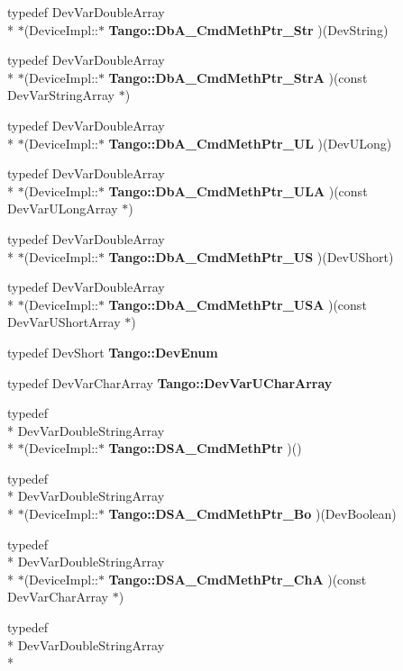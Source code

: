 \begin{DoxyCompactItemize}
typedef Dev\-Var\-Double\-Array \\*
$\ast$(Device\-Impl\-::$\ast$ {\bf Tango\-::\-Db\-A\-\_\-\-Cmd\-Meth\-Ptr\-\_\-\-Str} )(Dev\-String)
\item 
typedef Dev\-Var\-Double\-Array \\*
$\ast$(Device\-Impl\-::$\ast$ {\bf Tango\-::\-Db\-A\-\_\-\-Cmd\-Meth\-Ptr\-\_\-\-Str\-A} )(const Dev\-Var\-String\-Array $\ast$)
\item 
typedef Dev\-Var\-Double\-Array \\*
$\ast$(Device\-Impl\-::$\ast$ {\bf Tango\-::\-Db\-A\-\_\-\-Cmd\-Meth\-Ptr\-\_\-\-U\-L} )(Dev\-U\-Long)
\item 
typedef Dev\-Var\-Double\-Array \\*
$\ast$(Device\-Impl\-::$\ast$ {\bf Tango\-::\-Db\-A\-\_\-\-Cmd\-Meth\-Ptr\-\_\-\-U\-L\-A} )(const Dev\-Var\-U\-Long\-Array $\ast$)
\item 
typedef Dev\-Var\-Double\-Array \\*
$\ast$(Device\-Impl\-::$\ast$ {\bf Tango\-::\-Db\-A\-\_\-\-Cmd\-Meth\-Ptr\-\_\-\-U\-S} )(Dev\-U\-Short)
\item 
typedef Dev\-Var\-Double\-Array \\*
$\ast$(Device\-Impl\-::$\ast$ {\bf Tango\-::\-Db\-A\-\_\-\-Cmd\-Meth\-Ptr\-\_\-\-U\-S\-A} )(const Dev\-Var\-U\-Short\-Array $\ast$)
\item 
typedef Dev\-Short {\bf Tango\-::\-Dev\-Enum}
\item 
typedef Dev\-Var\-Char\-Array {\bf Tango\-::\-Dev\-Var\-U\-Char\-Array}
\item 
typedef \\*
Dev\-Var\-Double\-String\-Array \\*
$\ast$(Device\-Impl\-::$\ast$ {\bf Tango\-::\-D\-S\-A\-\_\-\-Cmd\-Meth\-Ptr} )()
\item 
typedef \\*
Dev\-Var\-Double\-String\-Array \\*
$\ast$(Device\-Impl\-::$\ast$ {\bf Tango\-::\-D\-S\-A\-\_\-\-Cmd\-Meth\-Ptr\-\_\-\-Bo} )(Dev\-Boolean)
\item 
typedef \\*
Dev\-Var\-Double\-String\-Array \\*
$\ast$(Device\-Impl\-::$\ast$ {\bf Tango\-::\-D\-S\-A\-\_\-\-Cmd\-Meth\-Ptr\-\_\-\-Ch\-A} )(const Dev\-Var\-Char\-Array $\ast$)
\item 
typedef \\*
Dev\-Var\-Double\-String\-Array \\*

\end{DoxyCompactItemize}
